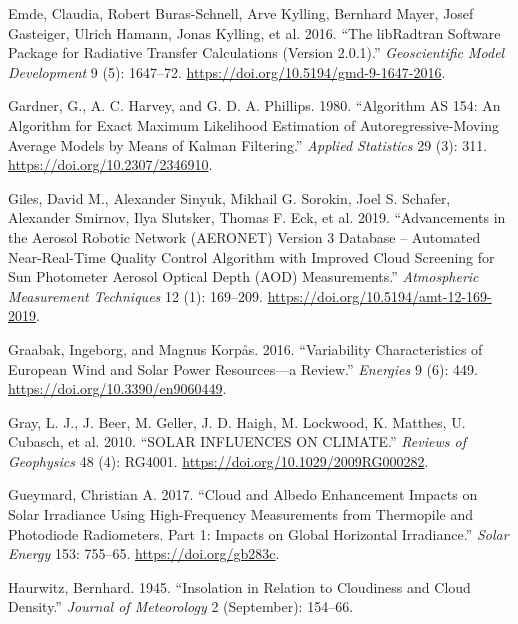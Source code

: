 \documentclass[
  preprint, 3p, authoryear]{article}
\newlength{\cslhangindent}
\newlength{\cslentryspacingunit} %
\newenvironment{CSLReferences}[2] %
 {%
  \setlength{\parindent}{0pt}
  \ifodd #1
  \let\oldpar\par
  \def\par{\hangindent=\cslhangindent\oldpar}
  \fi
  \setlength{\parskip}{#2\cslentryspacingunit}
 }%
 {}
\begin{document}
\begin{CSLReferences}{1}{0}
\leavevmode{}%
Emde, Claudia, Robert Buras-Schnell, Arve Kylling, Bernhard Mayer, Josef Gasteiger, Ulrich Hamann, Jonas Kylling, et al. 2016. {``The {libRadtran} Software Package for Radiative Transfer Calculations (Version 2.0.1).''} \emph{Geoscientific Model Development} 9 (5): 1647--72. \url{https://doi.org/10.5194/gmd-9-1647-2016}.

\leavevmode{}%
Gardner, G., A. C. Harvey, and G. D. A. Phillips. 1980. {``Algorithm {AS} 154: An Algorithm for Exact Maximum Likelihood Estimation of Autoregressive-Moving Average Models by Means of Kalman Filtering.''} \emph{Applied Statistics} 29 (3): 311. \url{https://doi.org/10.2307/2346910}.

\leavevmode{}%
Giles, David M., Alexander Sinyuk, Mikhail G. Sorokin, Joel S. Schafer, Alexander Smirnov, Ilya Slutsker, Thomas F. Eck, et al. 2019. {``Advancements in the Aerosol Robotic Network ({AERONET}) Version 3 Database -- Automated Near-Real-Time Quality Control Algorithm with Improved Cloud Screening for Sun Photometer Aerosol Optical Depth ({AOD}) Measurements.''} \emph{Atmospheric Measurement Techniques} 12 (1): 169--209. \url{https://doi.org/10.5194/amt-12-169-2019}.

\leavevmode{}%
Graabak, Ingeborg, and Magnus Korpås. 2016. {``Variability Characteristics of European Wind and Solar Power Resources---a Review.''} \emph{Energies} 9 (6): 449. \url{https://doi.org/10.3390/en9060449}.

\leavevmode{}%
Gray, L. J., J. Beer, M. Geller, J. D. Haigh, M. Lockwood, K. Matthes, U. Cubasch, et al. 2010. {``{SOLAR} {INFLUENCES} {ON} {CLIMATE}.''} \emph{Reviews of Geophysics} 48 (4): RG4001. \url{https://doi.org/10.1029/2009RG000282}.

\leavevmode{}%
Gueymard, Christian A. 2017. {``Cloud and Albedo Enhancement Impacts on Solar Irradiance Using High-Frequency Measurements from Thermopile and Photodiode Radiometers. Part 1: Impacts on Global Horizontal Irradiance.''} \emph{Solar Energy} 153: 755--65. \url{https://doi.org/gb283c}.

\leavevmode{}%
Haurwitz, Bernhard. 1945. {``Insolation in {Relation} to {Cloudiness} and {Cloud} {Density}.''} \emph{Journal of Meteorology} 2 (September): 154--66.


\end{CSLReferences}
\end{document}
